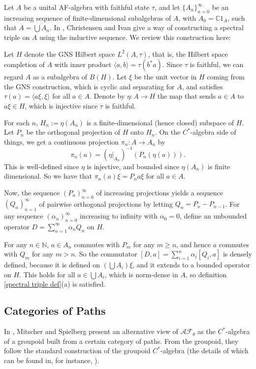 \documentclass[12pt]{amsart}
\newcommand{\AF}{\mathcal{A}\mathcal{F}}
\newcommand{\C}{\mathbb{C}}
\newcommand{\N}{\mathbb{N}}
\theoremstyle{plain} %
\theoremstyle{definition} %
\begin{document}
Let $A$ be a unital AF-algebra with faithful state $\tau$, and let $\{A_n\}_{n=0}^{\infty}$ be an increasing sequence of finite-dimensional subalgebras of $A$, with $A_0 = \C 1_A$, such that $A = \overline{\bigcup A_n}$. In \cite{CI06}, Christensen and Ivan give a way of constructing a spectral triple on $A$ using the inductive sequence. We review this construction here:

Let $H$ denote the GNS Hilbert space $L^2(A, \tau)$, that is, the Hilbert space completion of $A$ with inner product $\langle a, b \rangle = \tau(b^*a)$. Since $\tau$ is faithful, we can regard $A$ as a subalgebra of $B(H)$. Let $\xi$ be the unit vector in $H$ coming from the GNS construction, which is cyclic and separating for $A$, and satisfies $\tau(a) = \langle a \xi, \xi \rangle$ for all $a \in A$. Denote by $\eta : A \to H$ the map that sends $a \in A$ to $a \xi \in H$, which is injective since $\tau$ is faithful.

For each $n$, $H_n := \eta (A_n)$ is a finite-dimensional (hence closed) subspace of $H.$
Let $P_n$ be the orthogonal projection of $H$ onto $H_n$. On the $C^*$-algebra side of things, we get a continuous projection $\pi_n: A \to A_n$ by $$\pi_n(a)= \left( \eta|_{A_n} \right)^{-1}(P_n(\eta(a))).$$ This is well-defined since $\eta$ is injective, and bounded since $\eta(A_n)$ is finite dimensional. So we have that $\pi_n(a)\xi = P_n a \xi$ for all $a \in A$. 

Now, the sequence $(P_n)_{n=0}^{\infty}$ of increasing projections yields a sequence $(Q_n)_{n=1}^{\infty}$ of pairwise orthogonal projections by letting $Q_n = P_n - P_{n-1}$. For any sequence $(\alpha_n)_{n=0}^{\infty}$ increasing to infinity with $\alpha_0 = 0$, define an unbounded operator $D = \sum_{n=1}^{\infty} \alpha_n Q_n$ on $H$.

For any $n \in \N$, $a \in A_n$ commutes with $P_m$ for any $m \geq n$, and hence $a$ commutes with $Q_m$ for any $m > n$. So the commutator $[D,a] = \sum_{i=1}^n \alpha_i [Q_i, a]$ is densely defined, because it is defined on $\left( \bigcup A_i \right) \xi$, and it extends to a bounded operator on $H$.
This holds for all $a \in \bigcup A_i$, which is norm-dense in $A$, so definition \ref{spectral triple def}(a) is satisfied.

\subsection{Categories of Paths}

In \cite{MS22}, Mitscher and Spielberg present an alternative view of $\AF_{\theta}$ as the $C^*$-algebra of a groupoid built from a certain category of paths. From the  groupoid, they follow the standard construction of the groupoid $C^*$-algebra (the details of which can be found in, for instance, \cite{Put19}).
\end{document}
